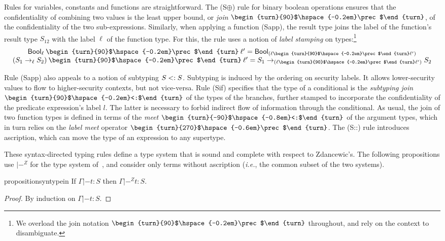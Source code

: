 \documentclass[authoryear,sort&compress,9pt,twocolumn,nocopyrightspace]{sigplanconf}
\newcommand{\Bool}{\mathsf{Bool}}
\newcommand{\?}{\textsf{\upshape ?}} \newcommand{\consistent}[1]{\widetilde{#1}}
\newcommand{\collecting}[1]{\wideparen{#1}}
\newcommand{\subjoin}{\mathbin{\begin{turn}{90}$\hspace{-0.2em}<:$\end{turn}}}
\newcommand{\submeet}{\mathbin{\begin{turn}{-90}$\hspace{-0.8em}<:$\end{turn}}}
\newcommand{\lx}{\ell} \newcommand{\ul}{\?}\newcommand{\clx}{{\tilde{\lx}}} \newcommand{\cll}{\collecting{\lx}} \newcommand{\cS}{{\consistent{S}}} \newcommand{\clS}{\collecting{S}}\newcommand{\subl}{\preccurlyeq}\newcommand{\csubl}{\;\consistent{\subl}\;}
\newcommand{\ljoincore}{\begin{turn}{90}$\hspace{-0.2em}\prec$\end{turn}}
\newcommand{\lmeetcore}{\begin{turn}{270}$\hspace{-0.6em}\prec$\end{turn}}
\newcommand{\ljoin}{\mathbin{\ljoincore}}
\newcommand{\lmeet}{\mathbin{\lmeetcore}}
\newcommand{\ie}{\emph{i.e.}\xspace}
\begin{document}
Rules for variables, constants and functions are straightforward.  The
(S$\oplus$) rule for binary boolean operations ensures that the confidentiality
of combining two values is the least upper bound, or \emph{join} $\ljoin$, of
the confidentiality of the two sub-expressions. Similarly, when applying a
function (Sapp), the result type joins the label of the function's result type
$S_{12}$ with the label $\lx$ of the function type. For this, the rule uses a
notion of \emph{label stamping} on types:\footnote{We overload the join notation $\ljoin$ throughout, and rely on the
  context to disambiguate.}
\begin{displaymath}
\begin{array}{c}
\Bool_{\lx} \ljoin \lx' = \Bool_{(\lx \ljoin {\lx'})} \\
(S_1 ->_{\lx} S_2) \ljoin \lx' = S_1 ->_{(\lx \ljoin {\lx'})} S_2 \\
\end{array}
\end{displaymath}

Rule (Sapp) also appeals to a notion of subtyping $S <: S$.  Subtyping is
induced by the ordering on security labels.  It allows lower-security values to
flow to higher-security contexts, but not vice-versa.  Rule (Sif) specifies
that the type of a conditional is the
\emph{subtyping join}
$\subjoin$ of the types of the branches, further stamped to incorporate the
confidentiality of the predicate expression's label $l$.  The latter is
necessary to forbid indirect flow of information through the conditional.  As
usual, the join of two function types is defined in terms of the \emph{meet}
$\submeet$ of the argument types, which in turn relies on the \emph{label meet}
operator $\lmeet$.
The (S::) rule introduces ascription, which can move the type of an expression
to any supertype.

These syntax-directed typing rules define a type system that is sound and
complete with respect to Zdancewic's.  The following propositions use $|-^{Z}$
for the type system of~\citet{zdancewic}, and consider only terms without
ascription (\ie, the common subset of the two systems).


\begin{restatable}{proposition}{syntypein}
  If $\Gamma |- t : S$ then $\Gamma |-^{Z} t : S$.
\end{restatable}
\begin{proof}
  By induction on $\Gamma |- t : S$.  
\end{proof}
\end{document}

